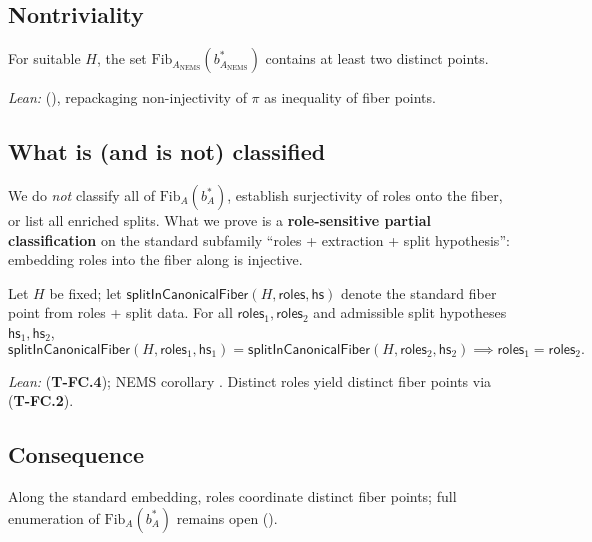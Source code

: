 \documentclass[11pt]{article}
\begin{document}
\subsection{Nontriviality}\label{sec:fiber-structure-nontrivial}
\begin{theorem}\label{thm:fiber-nontrivial}
For suitable $H$, the set $\mathrm{Fib}_{A_{\mathrm{NEMS}}}(b^\ast_{A_{\mathrm{NEMS}}})$ contains at least two distinct points.
\end{theorem}

\noindent\emph{Lean:}  (), repackaging non-injectivity of $\pi$ as inequality of fiber points.

\subsection{What is (and is not) classified}\label{sec:fiber-structure-classification}
We do \emph{not} classify all of $\mathrm{Fib}_A(b^\ast_A)$, establish surjectivity of roles onto the fiber, or list all enriched splits. What we prove is a \textbf{role-sensitive partial classification} on the standard subfamily ``roles + extraction + split hypothesis'': embedding roles into the fiber along  is injective.

\begin{theorem}\label{thm:role-inject}
Let $H$ be fixed; let $\mathsf{splitInCanonicalFiber}(H,\mathsf{roles},\mathsf{hs})$ denote the standard fiber point from roles + split data. For all $\mathsf{roles}_1,\mathsf{roles}_2$ and admissible split hypotheses $\mathsf{hs}_1,\mathsf{hs}_2$,
\[
  \mathsf{splitInCanonicalFiber}(H,\mathsf{roles}_1,\mathsf{hs}_1) = \mathsf{splitInCanonicalFiber}(H,\mathsf{roles}_2,\mathsf{hs}_2)
  \implies \mathsf{roles}_1 = \mathsf{roles}_2.
\]
\end{theorem}
\noindent\emph{Lean:}  (\textbf{T-FC.4}); NEMS corollary .\linebreak
Distinct roles yield distinct fiber points via  (\textbf{T-FC.2}).

\subsection{Consequence}\label{sec:fiber-structure-interpretation}
Along the standard embedding, roles coordinate distinct fiber points; full enumeration of $\mathrm{Fib}_A(b^\ast_A)$ remains open ().
\end{document}
